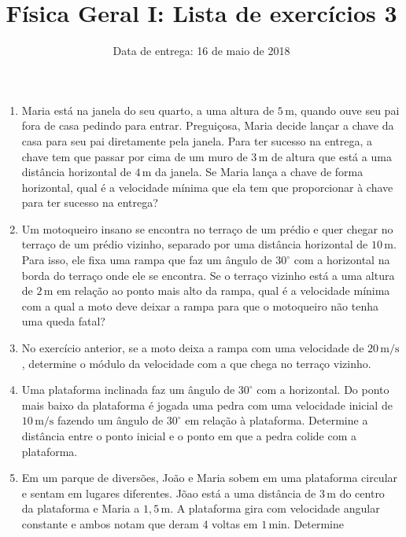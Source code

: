 \documentclass[fontsize=12pt]{scrartcl}
\title{Física Geral I: Lista de exercícios 3}
\author{Data de entrega: 16 de maio de 2018}
\date{}
\newcommand{\un}[1]{\mathrm{#1}}
\begin{document}
\maketitle
\begin{enumerate}
\item Maria está na janela do seu quarto, a uma altura de $5\,\un m$,
  quando ouve seu pai fora de casa pedindo para entrar. Preguiçosa,
  Maria decide lançar a chave da casa para seu pai diretamente pela
  janela. Para ter sucesso na entrega, a chave tem que passar por cima
  de um muro de $3\,\un m$ de altura que está a uma distância
  horizontal de $4\,\un m$ da janela. Se Maria lança a chave de forma
  horizontal, qual é a velocidade mínima que ela tem que proporcionar
  à chave para ter sucesso na entrega?
\item Um motoqueiro insano se encontra no terraço de um prédio e quer
  chegar no terraço de um prédio vizinho, separado por uma distância
  horizontal de $10\,\un m$. Para isso, ele fixa uma rampa que faz um
  ângulo de $30^\circ$ com a horizontal na borda do terraço onde ele
  se encontra. Se o terraço vizinho está a uma altura de $2\,\un m$ em
  relação ao ponto mais alto da rampa, qual é a velocidade mínima com
  a qual a moto deve deixar a rampa para que o motoqueiro não tenha
  uma queda fatal?
\item No exercício anterior, se a moto deixa a rampa com uma
  velocidade de $20\,\un m/\un s$, determine o módulo da velocidade
  com a que chega no terraço vizinho.
\item Uma plataforma inclinada faz um ângulo de $30^\circ$ com a
  horizontal. Do ponto mais baixo da plataforma é jogada uma pedra com
  uma velocidade inicial de $10\,\un m/\un s$ fazendo um ângulo de
  $30^\circ$ em relação à plataforma. Determine a distância entre o
  ponto inicial e o ponto em que a pedra colide com a plataforma.
\item Em um parque de diversões, João e Maria sobem em uma plataforma
  circular e sentam em lugares diferentes. Jõao está a uma distância
  de $3\,\un m$ do centro da plataforma e Maria a $1,5\,\un m$. A
  plataforma gira com velocidade angular constante e ambos notam que
  deram 4 voltas em $1\,\un{min}$. Determine
  \begin{enumerate}

\end{enumerate}
\end{enumerate}
\end{document}
